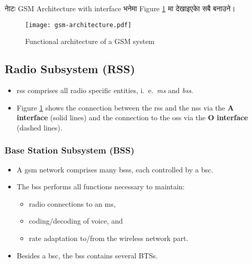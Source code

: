 \begin{framed}
\begin{nepali}
\noindent नाेटः GSM Architecture with interface भनेमा Figure \ref{fig:gsm-architecture} मा देखाइएकाे सबै बनाउने।
\end{nepali}
\end{framed}


\begin{figure}[hb!]
	\centering
	\texttt{[image: gsm-architecture.pdf]}
	\caption{Functional architecture of a GSM system}\label{fig:gsm-architecture}
\end{figure}

\subsection[Radio Subsystem]{Radio Subsystem (RSS)}
\begin{itemize}
	\item \gls{rss} comprises all radio specific entities, i.\ e.\,  \textit{\gls{ms}} and \textit{\gls{bss}}.
	\item Figure \ref{fig:gsm-architecture} shows the connection between the \gls{rss} and the \gls{nss} via the  \textbf{A interface} (solid lines) and the connection to the \gls{oss} via the \textbf{O interface} (dashed lines).
\end{itemize}


\subsubsection[BSS]{Base Station Subsystem (BSS)}
\begin{itemize}
	\item A \gls{gsm} network comprises many \gls{bss}s, each controlled by a \gls{bsc}. 
	\item The \gls{bss} performs all functions necessary to maintain: 
	\begin{itemize}
		\item radio connections to an \gls{ms}, 
		\item coding/decoding of voice, and 
		\item rate adaptation to/from the wireless network part.
	\end{itemize}
 \item Besides a \gls{bsc}, the \gls{bss} contains several BTSs.
\end{itemize}


